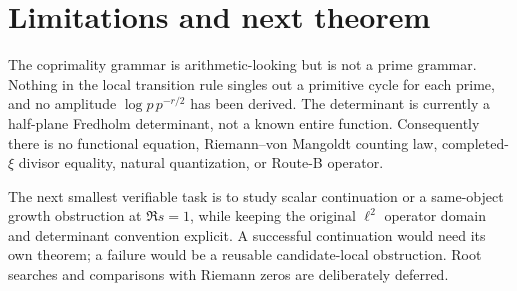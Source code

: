\section{Limitations and next theorem}

The coprimality grammar is arithmetic-looking but is not a prime grammar.
Nothing in the local transition rule singles out a primitive cycle for each
prime, and no amplitude \(\log p\,p^{-r/2}\) has been derived.  The determinant
is currently a half-plane Fredholm determinant, not a known entire function.
Consequently there is no functional equation, Riemann--von Mangoldt counting
law, completed-\(\xi\) divisor equality, natural quantization, or Route-B
operator.

The next smallest verifiable task is to study scalar continuation or a
same-object growth obstruction at \(\Re s=1\), while keeping the original
\(\ell^2\) operator domain and determinant convention explicit.  A successful
continuation would need its own theorem; a failure would be a reusable
candidate-local obstruction.  Root searches and comparisons with Riemann
zeros are deliberately deferred.
